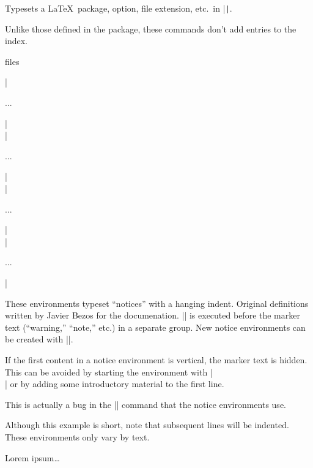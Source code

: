\documentclass{ltxguidex}
\begin{document}
Typesets a \LaTeX\ package, option, file extension, etc.\ in |\texttt|.

\begin{note}
	Unlike those defined in the  package, these commands
	don't add entries to the index.
\end{note}

\begin{LTXexample}
 files
\end{LTXexample}

\begin{desc}
|\begin{warning}...\end{warning}|\\
|\begin{note}...\end{note}|\\
|\begin{example}...\end{example}|\\
|\begin{bug}...\end{bug}|
\end{desc}

These environments typeset ``notices'' with a hanging indent. Original
definitions written by Javier Bezos for the  documenation.
|\ltxguidex@noticestyle| is executed before the marker text (``warning,''
``note,'' etc.) in a separate group. New notice environments can be created
with |\newnotice|.

\begin{bug}
	If the first content in a notice environment is vertical, the marker
	text is hidden. This can be avoided by starting the
	environment with |\leavevmode\\| or by adding some introductory
	material to the first line.

	This is actually a bug in the |\list| command that the notice
	environments use.
\end{bug}

\begin{example}
	Although this example is short, note that subsequent lines will
	be indented. These environments only vary by text.

\begin{LTXexample}
\begin{warning}
    Lorem ipsum\dots
\end{warning}
\end{LTXexample}
\end{example}
\end{document}
